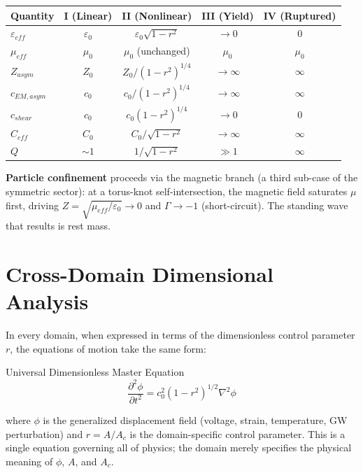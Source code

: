 \begin{center}
\begin{tabular}{|l|c|c|c|c|}
\hline
\textbf{Quantity} & \textbf{I (Linear)} & \textbf{II (Nonlinear)} & \textbf{III (Yield)} & \textbf{IV (Ruptured)} \\ \hline
$\varepsilon_{eff}$ & $\varepsilon_0$ & $\varepsilon_0 \sqrt{1-r^2}$ & $\to 0$ & 0 \\
$\mu_{eff}$         & $\mu_0$         & $\mu_0$ (unchanged)          & $\mu_0$ & $\mu_0$ \\
$Z_{asym}$          & $Z_0$           & $Z_0 / (1-r^2)^{1/4}$        & $\to \infty$ & $\infty$ \\
$c_{EM,asym}$       & $c_0$           & $c_0/(1-r^2)^{1/4}$          & $\to \infty$ & $\infty$ \\
$c_{shear}$         & $c_0$           & $c_0(1-r^2)^{1/4}$           & $\to 0$      & 0 \\
$C_{eff}$           & $C_0$           & $C_0 / \sqrt{1-r^2}$         & $\to \infty$ & $\infty$ \\
$Q$                 & $\sim 1$        & $1/\sqrt{1-r^2}$             & $\gg 1$      & $\infty$ \\ \hline
\end{tabular}
\end{center}

\noindent \textbf{Particle confinement} proceeds via the magnetic branch (a third sub-case of the symmetric sector): at a torus-knot self-intersection, the magnetic field saturates $\mu$ first, driving $Z = \sqrt{\mu_{eff}/\varepsilon_0} \to 0$ and $\Gamma \to -1$\gammaundeclared{} (short-circuit). The standing wave that results is rest mass.

\section{Cross-Domain Dimensional Analysis}
\label{sec:dimensional_analysis}

In every domain, when expressed in terms of the dimensionless control parameter $r$, the equations of motion take the same form:
\begin{resultbox}{Universal Dimensionless Master Equation}
\begin{equation}
    \frac{\partial^2 \phi}{\partial t^2} = c_0^2 (1-r^2)^{1/2} \nabla^2 \phi
\end{equation}
\end{resultbox}
where $\phi$ is the generalized displacement field (voltage, strain, temperature, GW perturbation) and $r = A/A_c$ is the domain-specific control parameter. This is a single equation governing all of physics; the domain merely specifies the physical meaning of $\phi$, $A$, and $A_c$.

